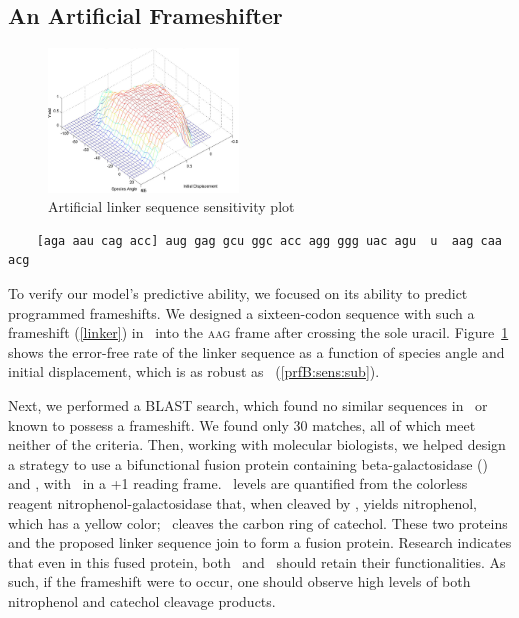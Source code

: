 \documentclass[12pt]{article}
\begin{document}
\subsection{An Artificial Frameshifter}
\label{section:linker}
\begin{figure}
  \centering
  \caption{Artificial linker sequence sensitivity plot}
  \label{linker:sens}
  \includegraphics[width=0.45\textwidth]{linker/sensitivity}
\end{figure}

\begin{cfigure}
  \caption{Artificial linker sequence with a 12-base leader sequence
    in brackets}
  \label{linker}
  \begin{verbatim}
    [aga aau cag acc] aug gag gcu ggc acc agg ggg uac agu  u  aag caa acg
  \end{verbatim}
\end{cfigure}

To verify our model's predictive ability, we focused on its ability to
predict programmed frameshifts. We designed a sixteen-codon sequence
with such a frameshift (\autoref{linker}) in \ecoli\ into
the \textsc{aag} frame after crossing the sole uracil.  Figure~\ref{linker:sens}
shows the error-free rate of the linker sequence as a function of species
angle and initial displacement, which is as robust as \prfB\ (\autoref{prfB:sens:sub}).

Next, we performed a BLAST search, which found no similar sequences in 
\ecoli\ or known to possess a frameshift. We found only 30 matches, all 
of which meet neither of the criteria. Then, working with molecular 
biologists, we helped design a strategy to use a bifunctional fusion 
protein containing beta-galactosidase (\bgals) and \xylE, with \xylE\ in 
a +1 reading frame. \bgals\ levels are quantified from the colorless 
reagent nitrophenol-galactosidase that, when cleaved by \bgals, yields 
nitrophenol, which has a yellow color; \xylE\ cleaves the carbon ring 
of catechol.  These two proteins and the proposed linker sequence join 
to form a fusion protein.  Research indicates that even in this fused 
protein, both \bgals\ and \xylE\ should retain their functionalities.
As such, if the frameshift were to occur, one should observe high 
levels of both nitrophenol and catechol cleavage products.
\end{document}
